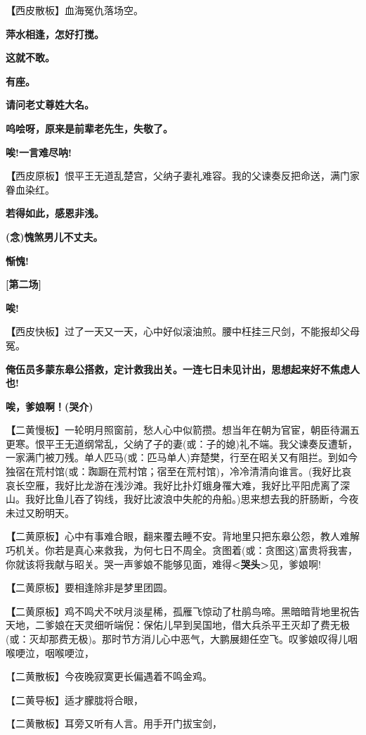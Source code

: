 \textbf{【}西皮散板】血海冤仇落场空。

\textbf{萍水相逢，怎好打搅。}

\textbf{这就不敢。}

\textbf{有座。}

\textbf{请问老丈尊姓大名。}

\textbf{呜哙呀，原来是前辈老先生，失敬了。}

\textbf{唉!一言难尽呐!}

\textbf{【}西皮原板】恨平王无道乱楚宫，父纳子妻礼难容。我的父谏奏反把命送，满门家眷血染红。

\textbf{若得如此，感恩非浅。}

\textbf{(念)愧煞男儿不丈夫。}

\textbf{惭愧!}

\textbf{{[}第二场{]}}

\textbf{唉!}

\textbf{【}西皮快板】过了一天又一天，心中好似滚油煎。腰中枉挂三尺剑，不能报却父母冤。

\textbf{俺伍员多蒙东皋公搭救，定计救我出关。一连七日未见计出，思想起来好不焦虑人也!}

\textbf{唉，爹娘啊！(哭介)}

\textbf{【}二黄慢板】一轮明月照窗前，愁人心中似箭攒。想当年在朝为官宦，朝臣待漏五更寒。恨平王无道纲常乱，父纳了子的妻(或：子的媳)礼不端。我父谏奏反遭斩，一家满门被刀残。单人匹马(或：匹马单人)弃楚樊，行至在昭关又有阻拦。到如今独宿在荒村馆(或：踟蹰在荒村馆；宿至在荒村馆)，冷冷清清向谁言。(我好比哀哀长空雁，我好比龙游在浅沙滩。我好比扑灯蛾身罹大难，我好比平阳虎离了深山。我好比鱼儿吞了钩线，我好比波浪中失舵的舟船。)思来想去我的肝肠断，今夜未过又盼明天。

\textbf{【}二黄原板】心中有事难合眼，翻来覆去睡不安。背地里只把东皋公怨，教人难解巧机关。你若是真心来救我，为何七日不周全。贪图着(或：贪图这)富贵将我害，你就该将我献与昭关。哭一声爹娘不能够见面，难得\textbf{\textless{}哭头\textgreater{}}见，爹娘啊!

\textbf{【}二黄原板】要相逢除非是梦里团圆。

\textbf{【}二黄原板】鸡不鸣犬不吠月淡星稀，孤雁飞惊动了杜鹃鸟啼。黑暗暗背地里祝告天地，二爹娘在天灵细听端倪：保佑儿早到吴国地，借大兵杀平王灭却了费无极(或：灭却那费无极)。那时节方消儿心中恶气，大鹏展翅任空飞。叹爹娘叹得儿咽喉哽泣，咽喉哽泣，

【二黄散板】今夜晚寂寞更长偏遇着不鸣金鸡。

【二黄导板】适才朦胧将合眼，

【二黄散板】耳旁又听有人言。用手开门拔宝剑，

